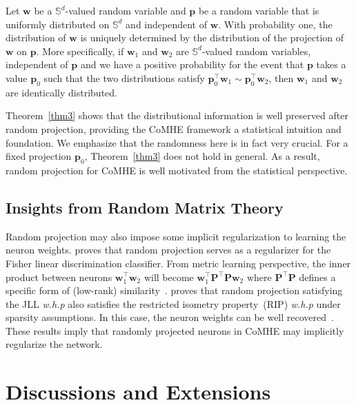 \begin{theorem} Let $\bm{w}$ be a $\mathbb{S}^d$-valued random variable and $\bm{p}$ be a random variable that is uniformly distributed on $\mathbb{S}^d$ and independent of $\bm{w}$. With probability one, the distribution of $\bm{w}$ is uniquely determined by the distribution of the projection of $\bm{w}$ on $\bm{p}$. More specifically, if $\bm{w}_1$ and $\bm{w}_2$ are $\mathbb{S}^d$-valued random variables, independent of $\bm{p}$ and we have a positive probability for the event that $\bm{p}$ takes a value $\bm{p}_0$ such that the two distributions satisfy $\bm{p}_0^\top\bm{w}_1\sim\bm{p}_0^\top\bm{w}_2$, then $\bm{w}_1$ and $\bm{w}_2$ are identically distributed.
\label{thm3}\end{theorem}

\par
Theorem~\ref{thm3} shows that the distributional information is well preserved after random projection, providing the CoMHE framework a statistical intuition and foundation. We emphasize that the randomness here is in fact very crucial. For a fixed projection $\bm{p}_0$, Theorem~\ref{thm3} does not hold in general. As a result, random projection for CoMHE is well motivated from the statistical perspective.

\subsection{Insights from Random Matrix Theory}

Random projection may also impose some implicit regularization to learning the neuron weights. \cite{durrant2015random} proves that random projection serves as a regularizer for the Fisher linear discrimination classifier. From metric learning perspective, the inner product between neurons $\bm{w}_1^\top\bm{w}_2$ will become $\bm{w}_1^\top\bm{P}^\top\bm{P}\bm{w}_2$ where $\bm{P}^\top\bm{P}$ defines a specific form of (low-rank) similarity~\cite{xing2003distance,liu2019neural}. \cite{baraniuk2008simple} proves that random projection satisfying the JLL \emph{w.h.p}
also satisfies the restricted isometry property~(RIP) \emph{w.h.p} under sparsity assumptions. In this case, the neuron weights can be well recovered~\cite{plan2013one,candes2006robust}. These results imply that randomly projected neurons in CoMHE may implicitly regularize the network.

\section{Discussions and Extensions}

